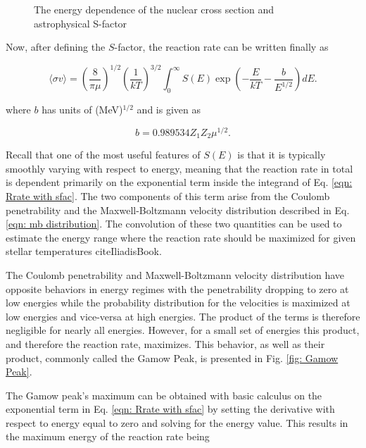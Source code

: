 \begin{figure}
\label{fig: energy dependence}
\caption{The energy dependence of the nuclear cross section and astrophysical S-factor  }
\end{figure}

Now, after defining the $S$-factor, the reaction rate can be written finally as 

\begin{equation}
\langle \sigma v \rangle = \left( \frac{8}{\pi \mu} \right) ^{1/2} \left( \frac{1}{kT} \right) ^{3/2} \int_{0}^{\infty} S (E) \exp \left(-\dfrac{E}{kT} - \dfrac{b}{E^{1/2}}\right) dE.
\label{eqn: Rrate with sfac}
\end{equation}

\noindent where $b$ has units of (MeV)$^{1/2}$ and is given as

\begin{equation}
b = 0.989534 Z_{1} Z_{2} \mu^{1/2}. 
\end{equation}

\noindent Recall that one of the most useful features of $S(E)$ is that it is typically smoothly varying with respect to energy, meaning that the reaction rate in total is dependent primarily on the exponential term inside the integrand of Eq. \ref{eqn: Rrate with sfac}. The two components of this term arise from the Coulomb penetrability and the Maxwell-Boltzmann velocity distribution described in Eq. \ref{eqn: mb distribution}. The convolution of these two quantities can be used to estimate the energy range where the reaction rate should be maximized for given stellar temperatures cite{IliadisBook}. 

The Coulomb penetrability and Maxwell-Boltzmann velocity distribution have opposite behaviors in energy regimes with the penetrability dropping to zero at low energies while the probability distribution for the velocities is maximized at low energies and vice-versa at high energies. The product of the terms is therefore negligible for nearly all energies. However, for a small set of energies this product, and therefore the reaction rate, maximizes. This behavior, as well as their product, commonly called the Gamow Peak, is presented in Fig. \ref{fig: Gamow Peak}. 

The Gamow peak's maximum can be obtained with basic calculus on the exponential term in Eq. \ref{eqn: Rrate with sfac} by setting the derivative with respect to energy equal to zero and solving for the energy value. This results in the maximum energy of the reaction rate being 

